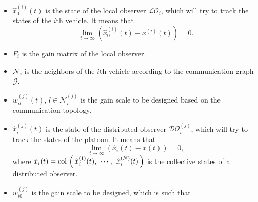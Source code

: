 \documentclass{ifacconf}
\def\col#1{\mathop{{\rm col}\,\left(\,#1\,\right)}}
\def\G{\mathcal{G}} %
\def\N{\mathcal{N}} %
\def\LO{\mathcal{LO}} %
\def\DO{\mathcal{DO}} %
\begin{document}
\begin{itemize}
    \item $\hat{x}_{0}^{(i)}(t)$ is the state of the local observer $\LO_{i}$, which will try to track the states of the $i$th vehicle. It means that
    \begin{equation}
        \lim_{t \rightarrow \infty} \left( \hat{x}_{0}^{(i)}(t) - x^{(i)}(t) \right)= 0. 
        \label{eq_hatx_0}
    \end{equation}
    \item $F_{i}$ is the gain matrix of the local observer. 
    \item ${\N}_{i}$ is the neighbors of the $i$th vehicle according to the communication graph $\G$.%
    \item {$w_{i l}^{(j)}(t)$, $l \in \N_{i}^{(j)}$ is the gain scale to be designed based on the communication topology.}
    \item $\hat{x}^{(j)}_i(t)$ is the state of the distributed observer $\DO_{i}^{(j)}$, which will try to track the states of the platoon. It means that 
    \begin{equation}
        \lim_{t \rightarrow \infty} \left( \hat{x}_i(t) - x(t) \right)= 0,
        \label{eq_hatx_i}
    \end{equation}
    where $\hat{x}_i(t) = \col{\hat{x}^{(1)}_i(t) , \ \cdots , \ \hat{x}^{(N)}_i(t) }$ is the collective states of all distributed observer.
    \item $w_{i 0}^{(j)}$ is the gain scale to be designed, which is such that
\end{itemize}


\end{document}
